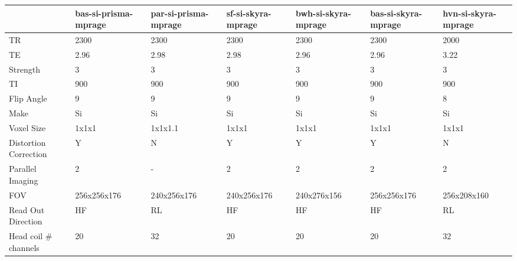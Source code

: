 \begin{table}
[]
\centering
\begin{tabular}{lllllll}
\toprule
{} & bas-si-prisma-mprage & par-si-prisma-mprage & sf-si-skyra-mprage & bwh-si-skyra-mprage & bas-si-skyra-mprage & hvn-si-skyra-mprage \\
\midrule
TR                    &                 2300 &                 2300 &               2300 &                2300 &                2300 &                2000 \\
TE                    &                 2.96 &                 2.98 &               2.98 &                2.96 &                2.96 &                3.22 \\
Strength              &                    3 &                    3 &                  3 &                   3 &                   3 &                   3 \\
TI                    &                  900 &                  900 &                900 &                 900 &                 900 &                 900 \\
Flip Angle            &                    9 &                    9 &                  9 &                   9 &                   9 &                   8 \\
Make                  &                   Si &                   Si &                 Si &                  Si &                  Si &                  Si \\
Voxel Size            &                1x1x1 &              1x1x1.1 &              1x1x1 &               1x1x1 &               1x1x1 &               1x1x1 \\
Distortion Correction &                    Y &                    N &                  Y &                   Y &                   Y &                   N \\
Parallel Imaging      &                    2 &                    - &                  2 &                   2 &                   2 &                   2 \\
FOV                   &          256x256x176 &          240x256x176 &        240x256x176 &         240x276x156 &         256x256x176 &         256x208x160 \\
Read Out Direction    &                   HF &                   RL &                 HF &                  HF &                  HF &                  RL \\
Head coil \# channels  &                   20 &                   32 &                 20 &                  20 &                  20 &                  32 \\

\end{tabular}
\end{table}
